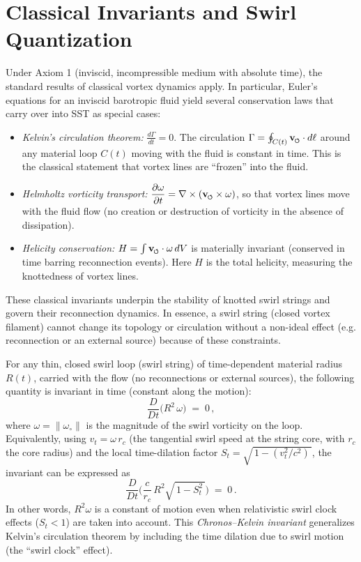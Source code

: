 \documentclass[reprint,aps,onecolumn,nofootinbib]{revtex4-2}
\newcommand{\swirlarrow}{%
    \mathchoice{\mkern-2mu\scriptstyle\boldsymbol{\circlearrowleft}}%
    {\mkern-2mu\scriptstyle\boldsymbol{\circlearrowleft}}%
    {\mkern-2mu\scriptscriptstyle\boldsymbol{\circlearrowleft}}%
    {\mkern-2mu\scriptscriptstyle\boldsymbol{\circlearrowleft}}%
}
\newcommand{\vswirl}{\mathbf{v}_{\swirlarrow}}
\begin{document}

    \section{Classical Invariants and Swirl Quantization}
	Under Axiom 1 (inviscid, incompressible medium with absolute time), the standard results of classical vortex dynamics apply. In particular, Euler’s equations for an inviscid barotropic fluid yield several conservation laws that carry over into SST as special cases:

	\begin{itemize}
	    \item \emph{Kelvin’s circulation theorem:} $\displaystyle \frac{d\Gamma}{dt} = 0$. The circulation $\Gamma = \oint_{C(t)} \vswirl \cdot d\ell$ around any material loop $C(t)$ moving with the fluid is constant in time. This is the classical statement that vortex lines are “frozen” into the fluid.
	    \item \emph{Helmholtz vorticity transport:} $\displaystyle \frac{\partial \omega}{\partial t} = \nabla \times (\vswirl \times \omega)$, so that vortex lines move with the fluid flow (no creation or destruction of vorticity in the absence of dissipation).
	    \item \emph{Helicity conservation:} $H = \int \vswirl \cdot \omega\, dV$ is materially invariant (conserved in time barring reconnection events). Here $H$ is the total helicity, measuring the knottedness of vortex lines.
	\end{itemize}

	These classical invariants underpin the stability of knotted swirl strings and govern their reconnection dynamics. In essence, a swirl string (closed vortex filament) cannot change its topology or circulation without a non-ideal effect (e.g. reconnection or an external source) because of these constraints.

	\begin{tcolorbox}[title=Axiom 1: Chronos–Kelvin Invariant]
		For any thin, closed swirl loop (swirl string) of time-dependent material radius $R(t)$, carried with the flow (no reconnections or external sources), the following quantity is invariant in time (constant along the motion):
		\[
			\frac{D}{Dt}\!\Big( R^2\,\omega \Big) \;=\; 0\,,
		\]
		where $\omega = \|\omega_{\circ}\|$ is the magnitude of the swirl vorticity on the loop. Equivalently, using $v_t = \omega\,r_c$ (the tangential swirl speed at the string core, with $r_c$ the core radius) and the local time-dilation factor $S_t = \sqrt{\,1 - (v_t^2/c^2)\,}$, the invariant can be expressed as
		\[
			\frac{D}{Dt}\!\Big( \frac{c}{r_c}\,R^2 \sqrt{\,1 - S_t^2\,}\Big) \;=\; 0\,.
		\]
		In other words, $R^2 \omega$ is a constant of motion even when relativistic swirl clock effects ($S_t<1$) are taken into account. This \emph{Chronos–Kelvin invariant} generalizes Kelvin’s circulation theorem by including the time dilation due to swirl motion (the “swirl clock” effect).
	\end{tcolorbox}
\end{document}
